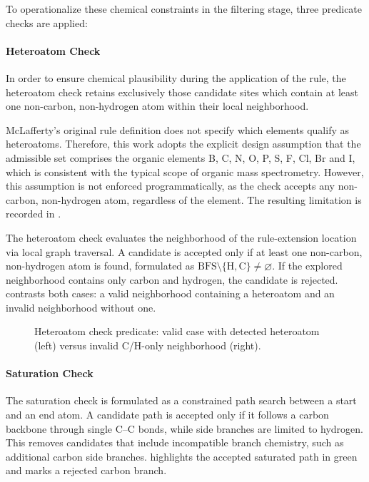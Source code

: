 To operationalize these chemical constraints in the filtering stage, three predicate checks are applied:

\paragraph{Heteroatom Check}
\label{par:heteroatom-check}
In order to ensure chemical plausibility during the application of the rule, the heteroatom check retains exclusively those candidate sites which contain at least one non-carbon, non-hydrogen atom within their local neighborhood.

McLafferty's original rule definition \cite[p.~57]{McLafferty1993} does not specify which elements qualify as heteroatoms.
Therefore, this work adopts the explicit design assumption that the admissible set comprises the organic elements B, C, N, O, P, S, F, Cl, Br and I, which is consistent with the typical scope of organic mass spectrometry.
However, this assumption is not enforced programmatically, as the check accepts any non-carbon, non-hydrogen atom, regardless of the element.
The resulting limitation is recorded in .

The heteroatom check evaluates the neighborhood of the rule-extension location via local graph traversal.
A candidate is accepted only if at least one non-carbon, non-hydrogen atom is found, formulated as $\mathrm{BFS}\setminus\{\mathrm{H},\mathrm{C}\}\neq\varnothing$.
If the explored neighborhood contains only carbon and hydrogen, the candidate is rejected.
 contrasts both cases: a valid neighborhood containing a heteroatom and an invalid neighborhood without one.

\begin{figure}[H]
    \centering
    
    \caption[Heteroatom check predicate]{
        Heteroatom check predicate:
        valid case with detected heteroatom (left) versus invalid C/H-only neighborhood (right).
    }
    \label{fig:heteroatom-check}
\end{figure}

\paragraph{Saturation Check}
The saturation check is formulated as a constrained path search between a start and an end atom.
A candidate path is accepted only if it follows a carbon backbone through single C--C bonds, while side branches are limited to hydrogen.
This removes candidates that include incompatible branch chemistry, such as additional carbon side branches.
 highlights the accepted saturated path in green and marks a rejected carbon branch.

